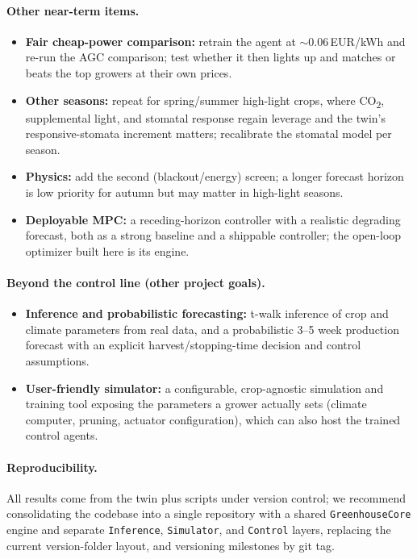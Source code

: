 \documentclass[11pt]{article}
\begin{document}
\paragraph{Other near-term items.}
\begin{itemize}[leftmargin=1.4em,itemsep=2pt]
\item \textbf{Fair cheap-power comparison:} retrain the agent at $\sim 0.06$\,EUR/kWh
and re-run the AGC comparison; test whether it then lights up and matches or beats
the top growers at their own prices.
\item \textbf{Other seasons:} repeat for spring/summer high-light crops, where
CO\textsubscript{2}, supplemental light, and stomatal response regain leverage and the twin's
responsive-stomata increment matters; recalibrate the stomatal model per season.
\item \textbf{Physics:} add the second (blackout/energy) screen; a longer forecast
horizon is low priority for autumn but may matter in high-light seasons.
\item \textbf{Deployable MPC:} a receding-horizon controller with a realistic
degrading forecast, both as a strong baseline and a shippable controller; the
open-loop optimizer built here is its engine.
\end{itemize}

\paragraph{Beyond the control line (other project goals).}
\begin{itemize}[leftmargin=1.4em,itemsep=2pt]
\item \textbf{Inference and probabilistic forecasting:} t-walk inference of crop and
climate parameters from real data, and a probabilistic 3--5 week production forecast
with an explicit harvest/stopping-time decision and control assumptions.
\item \textbf{User-friendly simulator:} a configurable, crop-agnostic simulation and
training tool exposing the parameters a grower actually sets (climate computer,
pruning, actuator configuration), which can also host the trained control agents.
\end{itemize}

\paragraph{Reproducibility.} All results come from the twin plus scripts under
version control; we recommend consolidating the codebase into a single repository
with a shared \texttt{GreenhouseCore} engine and separate \texttt{Inference},
\texttt{Simulator}, and \texttt{Control} layers, replacing the current version-folder
layout, and versioning milestones by git tag.
\end{document}
